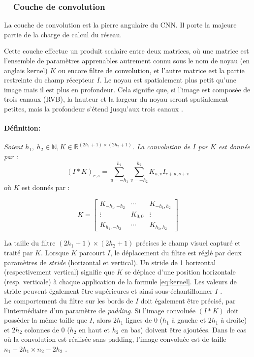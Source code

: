 
	\subsubsection{\qquad \textbullet \ \ Couche de convolution}

La couche de convolution est la pierre angulaire du CNN. Il porte la majeure partie de la charge de calcul du réseau.

Cette couche effectue un produit scalaire entre deux matrices, où une matrice est l'ensemble de paramètres apprenables autrement connu sous le nom de noyau (en anglais kernel) $K$ ou encore filtre de convolution, et l'autre matrice est la partie restreinte du champ récepteur $I$. Le noyau est spatialement plus petit qu'une image mais il est plus en profondeur. Cela signifie que, si l'image est composée de trois canaux (RVB), la hauteur et la largeur du noyau seront spatialement petites, mais la profondeur s'étend jusqu'aux trois canaux \cite{goodfellow2016deep}.

\paragraph*{Définition:}

\textit{Soient $h_1, \ h_2 \in \mathbb{N}, {K} \in \mathbb{R}^{(2h_1+1)\times(2h_2+1)}$. 
	La convolution de $I$ par $K$ est donnée par :} 
\begin{equation} \label{eq:kernel}
(I\ast K)_{r,s} = \sum_{u=-h_1}^{h_1} \sum_{v=-h_2}^{h_2} K_{u,v}I_{r+u,s+v}
\end{equation} 
où $K$ est donnés par : 

$$ 
K = \begin{bmatrix}
{K_{-h_1,-h_2}}&\cdots &{K_{-h_1,h_2}}\\
\vdots &{K_{0,0}} &\vdots \\
{K_{h_1,-h_2}}&\cdots &{K_{h_1,h_2}}
\end{bmatrix}
$$

La taille du filtre $(2h_1+1)\times(2h_2+1)$ précises le champ visuel capturé et traité par $K$.
Lorsque $K$ parcourt $I$, le déplacement du filtre est réglé par deux paramètres de \textit{stride} (horizontal et vertical). Un stride de 1 horizontal (respectivement vertical) signifie que $K$ se déplace d'une position horizontale (resp. verticale) à chaque application de la formule \ref{eq:kernel}. Les valeurs de stride peuvent également être supérieures et ainsi sous-échantillonner $I$ \cite{goodfellow2016deep, antoine2018apprentissage}.\\
Le comportement du filtre sur les bords de $I$ doit également être précisé, par l'intermédiaire d'un paramètre de \textit{padding}. Si l'image convoluée $(I\ast K)$ doit posséder la même taille que $I$, alors $2h_{1}$ lignes de 0 ($h_1$ à gauche et $2h_{1}$ à droite) et $2h_{2}$ colonnes de $0$ ($h_2$ en haut et $h_2$ en bas) doivent être ajoutées. Dans le cas où la convolution est réalisée sans padding, l'image convoluée est de taille $n_{1} - 2h_{1} \times n_{2} - 2h_{2}$ \cite{antoine2018apprentissage}.

